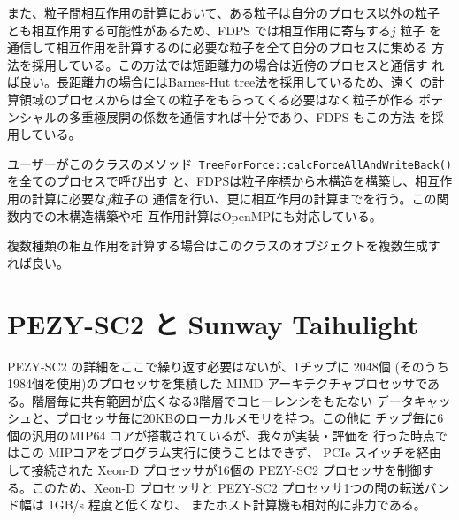 \documentclass[a4j]{jarticle}
\begin{document}

また、粒子間相互作用の計算において、ある粒子は自分のプロセス以外の粒子
とも相互作用する可能性があるため、FDPS では相互作用に寄与する$j$ 粒子
を通信して相互作用を計算するのに必要な粒子を全て自分のプロセスに集める
方法を採用している。この方法では短距離力の場合は近傍のプロセスと通信す
れば良い。長距離力の場合にはBarnes-Hut tree法を採用しているため、遠く
の計算領域のプロセスからは全ての粒子をもらってくる必要はなく粒子が作る
ポテンシャルの多重極展開の係数を通信すれば十分であり、FDPS もこの方法
を採用している\cite{2004PASJ...56..521M}。


ユーザーがこのクラスのメソッド{\tt
  TreeForForce::calcForceAllAndWriteBack()}を全てのプロセスで呼び出す
と、FDPSは粒子座標から木構造を構築し、相互作用の計算に必要な$j$粒子の
通信を行い、更に相互作用の計算までを行う。この関数内での木構造構築や相
互作用計算はOpenMPにも対応している。

複数種類の相互作用を計算する場合はこのクラスのオブジェクトを複数生成す
れば良い。


\section{PEZY-SC2 と Sunway Taihulight}

PEZY-SC2 の詳細をここで繰り返す必要はないが、1チップに 2048個 (そのうち
1984個を使用)のプロセッサを集積した MIMD アーキテクチャプロセッサであ
る。階層毎に共有範囲が広くなる3階層でコヒーレンシをもたない
データキャッシュと、プロセッサ毎に20KBのローカルメモリを持つ。この他に
チップ毎に6個の汎用のMIP64 コアが搭載されているが、我々が実装・評価を
行った時点ではこの MIPコアをプログラム実行に使うことはできず、
PCIe スイッチを経由して接続された Xeon-D プロセッサが16個の
PEZY-SC2 プロセッサを制御する。このため、Xeon-D プロセッサと
PEZY-SC2 プロセッサ1つの間の転送バンド幅は 1GB/s 程度と低くなり、
またホスト計算機も相対的に非力である。
\end{document}

